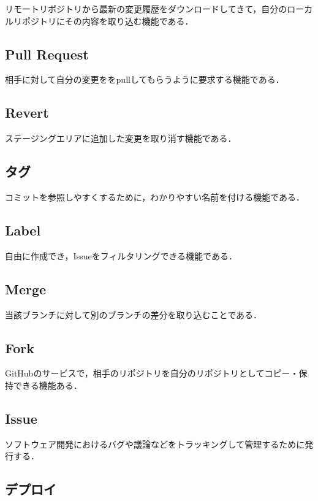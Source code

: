 リモートリポジトリから最新の変更履歴をダウンロードしてきて，自分のローカルリポジトリにその内容を取り込む機能である．


\subsection{Pull Request}

相手に対して自分の変更ををpullしてもらうように要求する機能である．


\subsection{Revert}

ステージングエリアに追加した変更を取り消す機能である．

\subsection{タグ}

コミットを参照しやすくするために，わかりやすい名前を付ける機能である．


\subsection{Label}

自由に作成でき，Issueをフィルタリングできる機能である．


\subsection{Merge}

当該ブランチに対して別のブランチの差分を取り込むことである．


\subsection{Fork}

GitHubのサービスで，相手のリポジトリを自分のリポジトリとしてコピー・保持できる機能ある．


\subsection{Issue}

ソフトウェア開発におけるバグや議論などをトラッキングして管理するために発行する．

\subsection{デプロイ}

